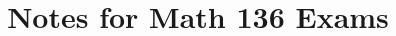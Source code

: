 \documentclass[10pt, landscape]{amsart}
\title{Notes for Math 136 Exams}
\theoremstyle{plain}
\newcommand{\1}{\mathbf{1}}
\begin{document}
 
\begin{multicols}{2}



\end{multicols}
\end{document}
